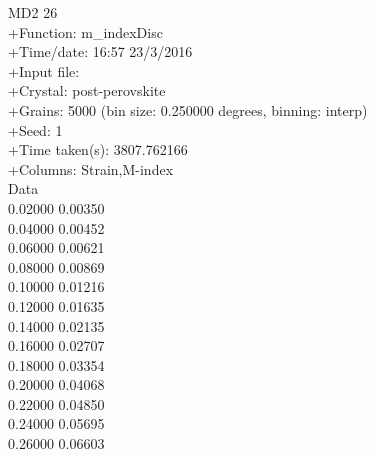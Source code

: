 \documentclass[a4paper,12pt,twoside]{report}
\numberwithin{equation}{chapter}
\begin{document}
\begin{texttt}
MD2\hspace{1cm}	     26\\
+Function:\hspace{1cm}      m\_indexDisc\\
+Time/date:\hspace{1cm}     16:57 23/3/2016\\
+Input file:\\    
+Crystal:\hspace{1cm}       post-perovskite\\
+Grains:\hspace{1cm}        5000 (bin size: 0.250000 degrees, binning: interp)\\
+Seed:\hspace{1cm}          1\\
+Time taken(s):\hspace{1cm} 3807.762166\\
+Columns:\hspace{1cm}       Strain,M-index\\
Data\\
   0.02000\hspace{1cm}    0.00350 \\
   0.04000\hspace{1cm}    0.00452 \\
   0.06000\hspace{1cm}    0.00621 \\
   0.08000\hspace{1cm}    0.00869 \\
   0.10000\hspace{1cm}    0.01216 \\
   0.12000\hspace{1cm}    0.01635 \\
   0.14000\hspace{1cm}    0.02135 \\
   0.16000\hspace{1cm}    0.02707 \\
   0.18000\hspace{1cm}    0.03354 \\
   0.20000\hspace{1cm}    0.04068 \\
   0.22000\hspace{1cm}    0.04850 \\
   0.24000\hspace{1cm}    0.05695 \\
   0.26000\hspace{1cm}    0.06603 \\

\end{texttt}
\end{document}
